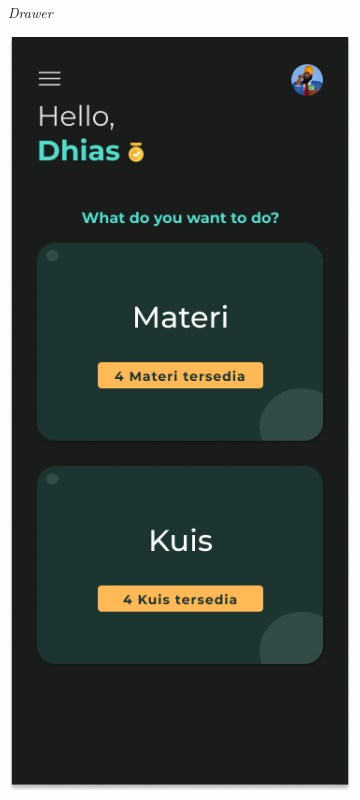 \begin{figure}[H]
\begin{subfigure}[b]{0.24\textwidth}
	  \caption{\textit{Drawer}}
	  \label{fig:HasilMainDash2}
	\end{subfigure}
	\begin{subfigure}[b]{0.24\textwidth}
		\centering
	  \includegraphics[width=\linewidth]{contents/chapter-3/images/HF-Main-dt.png}

\end{subfigure}
\end{figure}
